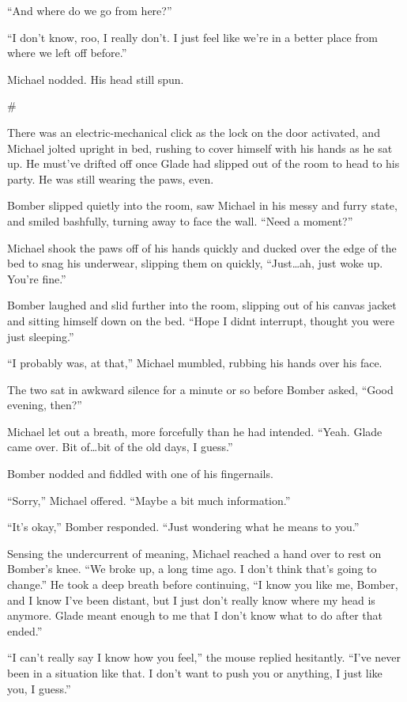 \documentclass[12pt,letterpaper,oneside]{memoir}
\newcommand\secdiv{
  \begin{center}
    \#
  \end{center}
}
\begin{document}
  ``And where do we go from here?''

  ``I don't know, roo, I really don't.  I just feel like we're in a better place from where we left off before.''

  Michael nodded.  His head still spun.

  \secdiv

  There was an electric-mechanical click as the lock on the door activated, and Michael jolted upright in bed, rushing to cover himself with his hands as he sat up.  He must've drifted off once Glade had slipped out of the room to head to his party.  He was still wearing the paws, even.

  Bomber slipped quietly into the room, saw Michael in his messy and furry state, and smiled bashfully, turning away to face the wall.  ``Need a moment?''

  Michael shook the paws off of his hands quickly and ducked over the edge of the bed to snag his underwear, slipping them on quickly, ``Just\ldots{}ah, just woke up.  You're fine.''

  Bomber laughed and slid further into the room, slipping out of his canvas jacket and sitting himself down on the bed.  ``Hope I didnt interrupt, thought you were just sleeping.''

  ``I probably was, at that,'' Michael mumbled, rubbing his hands over his face.

  The two sat in awkward silence for a minute or so before Bomber asked, ``Good evening, then?''

  Michael let out a breath, more forcefully than he had intended.  ``Yeah.  Glade came over.  Bit of\ldots{}bit of the old days, I guess.''

  Bomber nodded and fiddled with one of his fingernails.

  ``Sorry,'' Michael offered.  ``Maybe a bit much information.''

  ``It's okay,'' Bomber responded.  ``Just wondering what he means to you.''

  Sensing the undercurrent of meaning, Michael reached a hand over to rest on Bomber's knee.  ``We broke up, a long time ago. I don't think that's going to change.''  He took a deep breath before continuing, ``I know you like me, Bomber, and I know I've been distant, but I just don't really know where my head is anymore.  Glade meant enough to me that I don't know what to do after that ended.''

  ``I can't really say I know how you feel,'' the mouse replied hesitantly.  ``I've never been in a situation like that.  I don't want to push you or anything, I just like you, I guess.''
\end{document}
